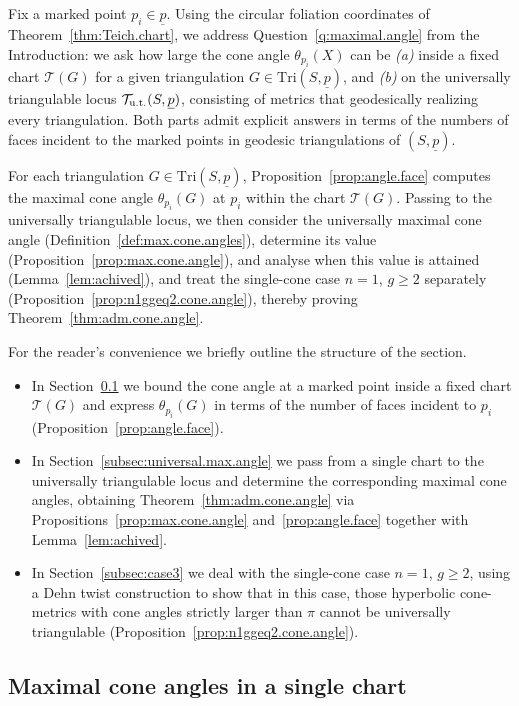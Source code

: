 \documentclass[11pt, letterpaper]{amsart}
\theoremstyle{definition}
\theoremstyle{remark}
\newcommand{\up}{\underline{p}}
\newcommand{\Sp}{(S,\up)}
\newcommand{\TSp}{\text{Tri}\Sp}
\newcommand{\cT}{\mathcal{T}}
\numberwithin{equation}{section}
\begin{document}
Fix a marked point \(p_i\in\up\).
Using the circular foliation coordinates of Theorem~\ref{thm:Teich.chart},
we address Question~\ref{q:maximal.angle} from the Introduction: we ask how
large the cone angle \(\theta_{p_i}(X)\) can be
\emph{(a)} inside a fixed chart \(\cT(G)\) for a given triangulation
\(G\in\TSp\), and
\emph{(b)} on the universally triangulable locus
\(\cT_{\rm u.t.}\Sp\), consisting of metrics that geodesically realizing every triangulation.
Both parts admit explicit answers in terms of the numbers of faces incident
to the marked points in geodesic triangulations of \((S,\up)\).

For each triangulation \(G\in\TSp\),
Proposition~\ref{prop:angle.face} computes the maximal cone angle
\(\theta_{p_i}(G)\) at \(p_i\) within the chart \(\cT(G)\).
Passing to the universally triangulable locus, we then consider the universally maximal cone angle (Definition~\ref{def:max.cone.angles}), determine its value (Proposition~\ref{prop:max.cone.angle}), and analyse
when this value is attained (Lemma~\ref{lem:achived}), and treat the
single-cone case \(n=1\), \(g\ge2\) separately
(Proposition~\ref{prop:n1ggeq2.cone.angle}), thereby proving
Theorem~\ref{thm:adm.cone.angle}.

For the reader’s convenience we briefly outline the structure of the section.
\begin{itemize}
  \item In Section~\ref{subsec:max.angle.single.chart} we bound the cone
  angle at a marked point inside a fixed chart \(\cT(G)\) and express
  \(\theta_{p_i}(G)\) in terms of the number of faces incident to \(p_i\)
  (Proposition~\ref{prop:angle.face}).
  \item In Section~\ref{subsec:universal.max.angle} we pass from a single
  chart to the universally triangulable locus and determine the corresponding
  maximal cone angles, obtaining Theorem~\ref{thm:adm.cone.angle} via
  Propositions~\ref{prop:max.cone.angle} and~\ref{prop:angle.face} together
  with Lemma~\ref{lem:achived}.
  \item In Section~\ref{subsec:case3} we deal with the single-cone case
  \(n=1\), \(g\ge2\), using a Dehn twist construction to show that in this case, those hyperbolic cone-metrics with cone angles strictly larger than \(\pi\) cannot be universally triangulable
  (Proposition~\ref{prop:n1ggeq2.cone.angle}).
\end{itemize}

\subsection{Maximal cone angles in a single chart}
\label{subsec:max.angle.single.chart}
\end{document}
